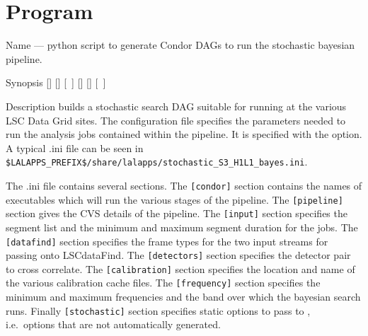 \section{Program }
\label{program:lalapps-stochastic-bayes}

\begin{entry}
\item[Name]
 --- python script to generate Condor DAGs
to run the stochastic bayesian pipeline.

\item[Synopsis]
 \newline \hspace*{0.5in}
[] \newline \hspace*{0.5in}
[] \newline \hspace*{0.5in}
[~] \newline \hspace*{0.5in}
[] \newline \hspace*{0.5in}
[] \newline \hspace*{0.5in}
[~] \newline \hspace*{0.5in}
~ \newline \hspace*{0.5in}
~

\item[Description]
 builds a stochastic search DAG suitable
for running at the various LSC Data Grid sites. The configuration file
specifies the parameters needed to run the analysis jobs contained
within the pipeline. It is specified with the 
option. A typical .ini file can be seen in\\
\texttt{\$LALAPPS\_PREFIX\$/share/lalapps/stochastic\_S3\_H1L1\_bayes.ini}.

The .ini file contains several sections. The \verb$[condor]$ section
contains the names of executables which will run the various stages of
the pipeline. The \verb$[pipeline]$ section gives the CVS details of the
pipeline. The \verb$[input]$ section specifies the segment list and the
minimum and maximum segment duration for the jobs. The \verb$[datafind]$
section specifies the frame types for the two input streams for passing
onto LSCdataFind. The \verb$[detectors]$ section specifies the detector
pair to cross correlate. The \verb$[calibration]$ section specifies the
location and name of the various calibration cache files. The
\verb$[frequency]$ section specifies the minimum and maximum frequencies
and the band over which the bayesian search runs. Finally
\verb$[stochastic]$ section specifies static options to pass to
, i.e.~options that are not automatically
generated.


\end{entry}
